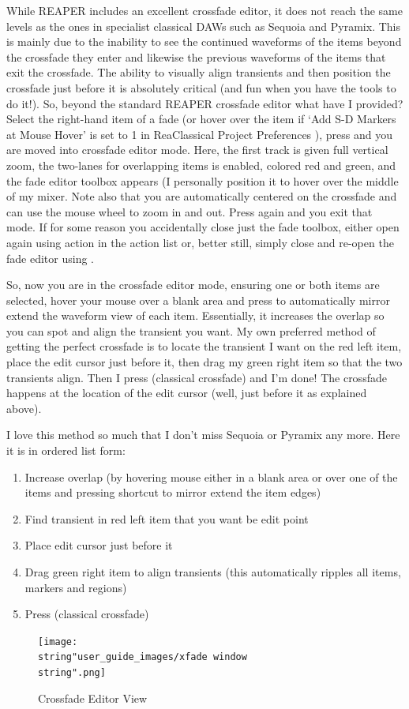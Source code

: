 \documentclass[10pt,american]{article}
\begin{document}
While REAPER includes an excellent crossfade editor, it does not reach the same
levels as the ones in specialist classical DAWs such as Sequoia and Pyramix.
This is mainly due to the inability to see the continued waveforms of the items
beyond the crossfade they enter and likewise the previous waveforms of the items
that exit the crossfade. The ability to visually align transients and then
position the crossfade just before it is absolutely critical (and fun when you
have the tools to do it!). So, beyond the standard REAPER crossfade editor what
have I provided? Select the right-hand item of a fade (or hover over the item if
`Add S-D Markers at Mouse Hover' is set to 1 in ReaClassical Project Preferences
), press  and you are moved into crossfade editor mode. Here,
the first track is given full vertical zoom, the two-lanes for overlapping items
is enabled, colored red and green, and the fade editor toolbox appears (I
personally position it to hover over the middle of my mixer. Note also that you
are automatically centered on the crossfade and can use the mouse wheel to zoom
in and out. Press  again and you exit that mode. If for some reason you
accidentally close just the fade toolbox, either open again using action in the
action list or, better still, simply close and re-open the fade editor using
 .

So, now you are in the crossfade editor mode, ensuring one or both items are
selected, hover your mouse over a blank area and press  to automatically
mirror extend the waveform view of each item. Essentially, it increases the
overlap so you can spot and align the transient you want. My own preferred
method of getting the perfect crossfade is to locate the transient I want on the
red left item, place the edit cursor just before it, then drag my green right
item so that the two transients align. Then I press  (classical
crossfade) and I'm done! The crossfade happens at the location of the edit
cursor (well, just before it as explained above). 

I love this method so much that I don't miss Sequoia or Pyramix any more. Here
it is in ordered list form:
\begin{enumerate}
\item Increase overlap (by hovering mouse either in a blank area or over one of
the items and pressing  shortcut to mirror extend the item edges)
\item Find transient in red left item that you want be edit point
\item Place edit cursor just before it
\item Drag green right item to align transients (this automatically ripples all
items, markers and regions)
\item Press  (classical crossfade)
\end{enumerate}
\begin{figure}
\texttt{[image: \\string"user\_guide\_images/xfade window\\string".png]}

\caption{Crossfade Editor View}

\end{figure}
\end{document}
